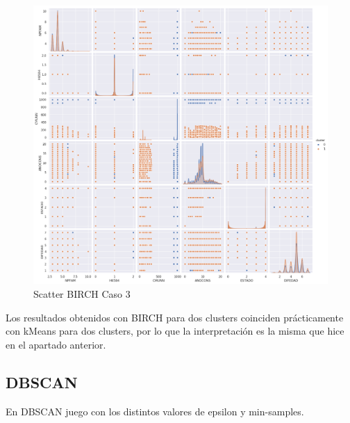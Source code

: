 \begin{figure}[H] %
	\centering
	\includegraphics[scale=0.4]{birch3.png}  %
	\caption{Scatter BIRCH Caso 3} 
	\label{fig:sc-br-caso3}
\end{figure}

Los resultados obtenidos con BIRCH para dos clusters coinciden prácticamente con kMeans para dos clusters, por lo que la interpretación es la misma que hice en el apartado anterior.

\newpage

\subsection{DBSCAN}

En DBSCAN juego con los distintos valores de epsilon y min-samples.


